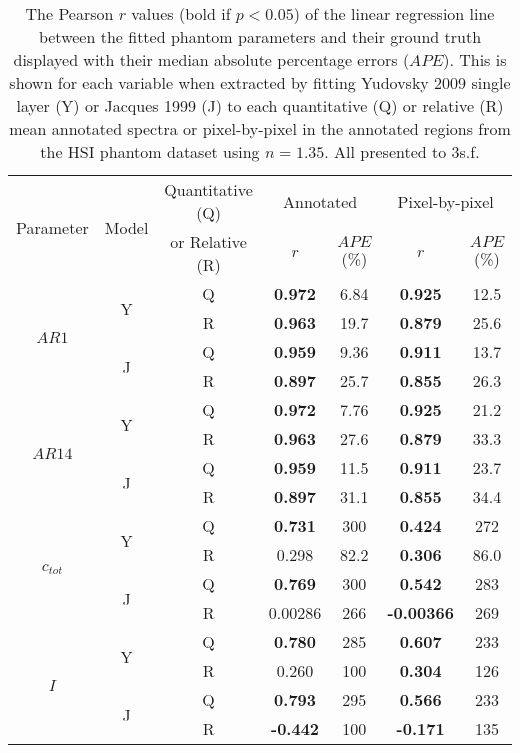 \begin{table}[h!]
    \centering
    \caption{The Pearson $r$ values (bold if $p<0.05$) of the linear regression line between the fitted phantom parameters and their ground truth displayed with their median absolute percentage errors ($APE$). This is shown for each variable when extracted by fitting Yudovsky 2009 single layer (Y) or Jacques 1999 (J) to each quantitative (Q) or relative (R) mean annotated spectra or pixel-by-pixel in the annotated regions from the HSI phantom dataset using $n=1.35$. All presented to 3s.f.}
    \begin{tabular}{|ccc|cc|cc|}
        \hline
       \multirow{2}{*}{Parameter} & \multirow{2}{*}{Model} & Quantitative (Q) & \multicolumn{2}{c|}{Annotated} & \multicolumn{2}{c|}{Pixel-by-pixel} \\
        & & or Relative (R) & $r$ & $APE$ (\%) & $r$ & $APE$ (\%) \\
        \hline
        \multirow{4}{*}{$AR1$} & \multirow{2}{*}{Y} & Q & \textbf{0.972} & 6.84 & \textbf{0.925} & 12.5 \\
        & & R & \textbf{0.963} & 19.7 & \textbf{0.879} & 25.6 \\
        \cline{2-7}
        & \multirow{2}{*}{J} & Q & \textbf{0.959} & 9.36 & \textbf{0.911} & 13.7 \\
        & & R & \textbf{0.897} & 25.7 & \textbf{0.855} & 26.3 \\
        \hline
        \multirow{4}{*}{$AR14$} & \multirow{2}{*}{Y} & Q & \textbf{0.972} & 7.76 & \textbf{0.925} & 21.2 \\
        & & R & \textbf{0.963} & 27.6 & \textbf{0.879} & 33.3 \\
        \cline{2-7}
        & \multirow{2}{*}{J} & Q & \textbf{0.959} & 11.5 & \textbf{0.911} & 23.7 \\
        & & R & \textbf{0.897} & 31.1 & \textbf{0.855} & 34.4 \\
        \hline
        \multirow{4}{*}{$c_{tot}$} & \multirow{2}{*}{Y} & Q & \textbf{0.731} & 300 & \textbf{0.424} & 272 \\
        & & R & 0.298 & 82.2 & \textbf{0.306} & 86.0 \\
        \cline{2-7}
        & \multirow{2}{*}{J} & Q & \textbf{0.769} & 300 & \textbf{0.542} & 283 \\
        & & R & 0.00286 & 266 & \textbf{-0.00366} & 269 \\
        \hline
        \multirow{4}{*}{$I$} & \multirow{2}{*}{Y} & Q & \textbf{0.780} & 285 & \textbf{0.607} & 233 \\
        & & R & 0.260 & 100 & \textbf{0.304} & 126 \\
        \cline{2-7}
        & \multirow{2}{*}{J} & Q & \textbf{0.793} & 295 & \textbf{0.566} & 233 \\
        & & R & \textbf{-0.442} & 100 & \textbf{-0.171} & 135 \\
        \hline
    \end{tabular}    
    \label{tb:backwardsHSIphantomsann}
\end{table}

